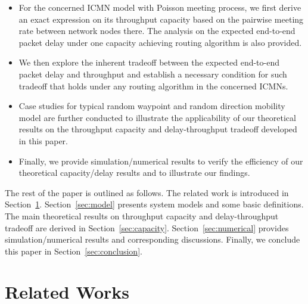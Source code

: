 \documentclass[twocolumn, 10pt]{svjour3}         \smartqed  \usepackage{graphicx}
\begin{document}
\begin{itemize}
	\item For the concerned ICMN model with Poisson meeting process, we first derive an exact expression on its throughput capacity based on the pairwise meeting rate between network nodes there. 
The analysis on the expected end-to-end packet delay under one capacity achieving routing algorithm is also provided. 	
	\item We then explore the inherent tradeoff between the expected end-to-end packet delay and  throughput  and establish a necessary condition for such tradeoff that holds under any routing algorithm in the concerned ICMNs.
	\item Case studies for typical random waypoint and random direction mobility model are further conducted to illustrate the applicability of our  theoretical results on the throughput capacity and delay-throughput tradeoff developed in this paper.
	\item Finally, we provide simulation/numerical results to  verify the efficiency of our theoretical capacity/delay results and to illustrate our  findings.
\end{itemize}

The rest of the paper is outlined as follows.
The related work is introduced in Section~\ref{sec:related_work}.
Section~\ref{sec:model} presents system models and some basic definitions.
The main theoretical results on throughput capacity and delay-throughput tradeoff are derived in Section~\ref{sec:capacity}.
Section~\ref{sec:numerical} provides simulation/numerical results and corresponding discussions.
Finally, we conclude this paper in Section~\ref{sec:conclusion}.





\section{Related Works}\label{sec:related_work}
\end{document}
